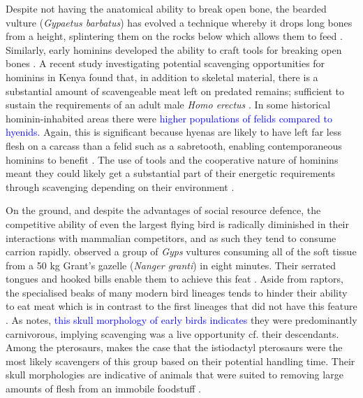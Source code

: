 \documentclass[a4paper,12pt]{article}
\begin{document}
Despite not having the anatomical ability to break open bone, the bearded vulture (\textit{Gypaetus barbatus}) has evolved a technique whereby it drops long bones from a height, splintering them on the rocks below which allows them to feed \citep{margalida2008bearded}. 
Similarly, early hominins developed the ability to craft tools for breaking open bones \citep{ARCM:ARCM12084}.
A recent study investigating potential scavenging opportunities for hominins in Kenya found that, in addition to skeletal material, there is a substantial amount of scavengeable meat left on predated remains; sufficient to sustain the requirements of an adult male \textit{Homo erectus} \citep{pobiner2015new}.
In some historical hominin-inhabited areas there were \textcolor{blue}{higher populations of felids compared to hyenids.}
Again, this is significant because hyenas are likely to have left far less flesh on a carcass than a felid such as a sabretooth, enabling contemporaneous hominins to benefit \citep{pobiner2015new}.
The use of tools and the cooperative nature of hominins meant they could likely get a substantial part of their energetic requirements through scavenging depending on their environment \citep{moleon2014humans}.

On the ground, and despite the advantages of social resource defence, the competitive ability of even the largest flying bird is radically diminished in their interactions with mammalian competitors, and as such they tend to consume carrion rapidly. 
\cite{houston1974role} observed a group of \textit{Gyps} vultures consuming all of the soft tissue from a 50 kg Grant’s gazelle (\textit{Nanger granti}) in eight minutes. 
Their serrated tongues and hooked bills enable them to achieve this feat \citep{houston1975digestive}. 
Aside from raptors, the specialised beaks of many modern bird lineages tends to hinder their ability to eat meat which is in contrast to the first lineages that did not have this feature \citep{martyniuk2012field}. 
As \cite{martyniuk2012field} notes, \textcolor{blue}{this skull morphology of early birds indicates} they were predominantly carnivorous, implying scavenging was a live opportunity cf. their descendants. 
Among the pterosaurs, \cite{witton2013pterosaurs} makes the case that the istiodactyl pterosaurs were the most likely scavengers of this group based on their potential handling time. 
Their skull morphologies are indicative of animals that were suited to removing large amounts of flesh from an immobile foodstuff \citep{witton2013pterosaurs}. 
\end{document}
